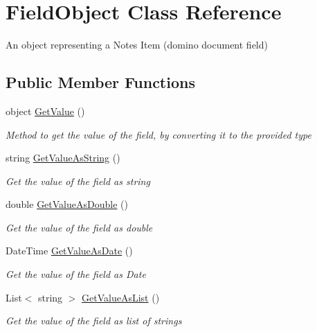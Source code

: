 \hypertarget{class_field_object}{}\section{Field\+Object Class Reference}
\label{class_field_object}


An object representing a Notes Item (domino document field)  


\subsection*{Public Member Functions}
\begin{DoxyCompactItemize}
\item 
object \mbox{\hyperlink{class_field_object_a65571e8154ad1333252cb9a8ab5f2c45}{Get\+Value}} ()
\begin{DoxyCompactList}\small\item\em Method to get the value of the field, by converting it to the provided type \end{DoxyCompactList}\item 
string \mbox{\hyperlink{class_field_object_ad223b04d429de4b2c57838ffb41d124b}{Get\+Value\+As\+String}} ()
\begin{DoxyCompactList}\small\item\em Get the value of the field as string \end{DoxyCompactList}\item 
double \mbox{\hyperlink{class_field_object_aafe2b7d3e7d414345d85e19dddce3c47}{Get\+Value\+As\+Double}} ()
\begin{DoxyCompactList}\small\item\em Get the value of the field as double \end{DoxyCompactList}\item 
Date\+Time \mbox{\hyperlink{class_field_object_a797ebc6615a86bafd9bd17f09562f2ee}{Get\+Value\+As\+Date}} ()
\begin{DoxyCompactList}\small\item\em Get the value of the field as Date \end{DoxyCompactList}\item 
List$<$ string $>$ \mbox{\hyperlink{class_field_object_a635d7598cbf7bbc29821cb1c012de964}{Get\+Value\+As\+List}} ()
\begin{DoxyCompactList}\small\item\em Get the value of the field as list of strings \end{DoxyCompactList}\end{DoxyCompactItemize}
